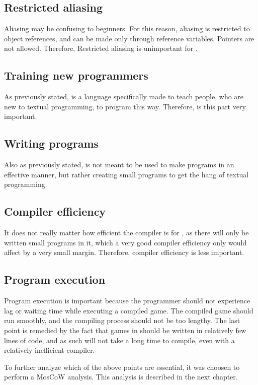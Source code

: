 \subsection*{Restricted aliasing}
Aliasing may be confusing to beginners. For this reason, aliasing is restricted to object references, and can be made only through reference variables. Pointers are not allowed. Therefore, Restricted aliasing is unimportant for \lang{}. 

\subsection*{Training new programmers} 
As previously stated, \lang{} is a language specifically made to teach people, who are new to textual programming, to program this way. Therefore, is this part very important. %

\subsection*{Writing programs}
Also as previously stated, \lang{} is not meant to be used to make programs in an effective manner, but rather creating small programs to get the hang of textual programming. 

\subsection*{Compiler efficiency}
It does not really matter how efficient the compiler is for \lang{}, as there will only be written small programs in it, which a very good compiler efficiency only would affect by a very small margin. Therefore, compiler efficiency is less important.

\subsection*{Program execution}
Program execution is important because the programmer should not experience lag or waiting time while executing a compiled game. The compiled game should run smoothly, and the compiling process should not be too lengthy. The last point is remedied by the fact that games in \lang{} should be written in relatively few lines of code, and as such will not take a long time to compile, even with a relatively inefficient compiler. 

To further analyze which of the above points are essential, it was choosen to perform a MosCoW analysis. This analysis is described in the next chapter. 
